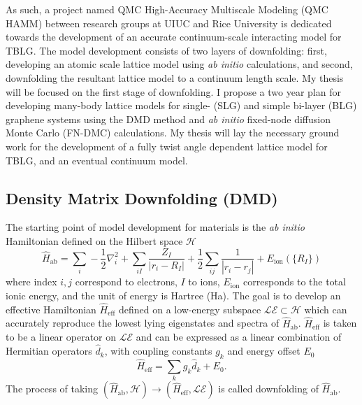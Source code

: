 \documentclass[12pt]{article}
\begin{document}
As such, a project named QMC High-Accuracy Multiscale Modeling (QMC HAMM) between research groups at UIUC and Rice University is dedicated towards the development of an accurate continuum-scale interacting model for TBLG.
The model development consists of two layers of downfolding: first, developing an atomic scale lattice model using \textit{ab initio} calculations, and second, downfolding the resultant lattice model to a continuum length scale.
My thesis will be focused on the first stage of downfolding.
I propose a two year plan for developing many-body lattice models for single- (SLG) and simple bi-layer (BLG) graphene systems using the DMD method and \textit{ab initio} fixed-node diffusion Monte Carlo (FN-DMC) calculations.
My thesis will lay the necessary ground work for the development of a fully twist angle dependent lattice model for TBLG, and an eventual continuum model.

\subsection{Density Matrix Downfolding (DMD)}
The starting point of model development for materials is the \textit{ab initio} Hamiltonian defined on the Hilbert space $\mathcal{H}$
\begin{equation}
\hat{H}_\text{ab} = \sum_i -\frac{1}{2} \nabla_i^2 + \sum_{iI}\frac{Z_I}{|r_i - R_I|} + \frac{1}{2} \sum_{ij} \frac{1}{|r_i - r_j|} + E_\text{ion}(\{R_I\})  
\label{eq:Hab}
\end{equation}
where index $i,j$ correspond to electrons, $I$ to ions, $E_\text{ion}$ corresponds to the total ionic energy, and the unit of energy is Hartree (Ha).
The goal is to develop an effective Hamiltonian $\hat{H}_\text{eff}$ defined on a low-energy subspace $\mathcal{LE} \subset \mathcal{H}$ which can accurately reproduce the lowest lying eigenstates and spectra of $\hat{H}_\text{ab}$.
$\hat{H}_\text{eff}$ is taken to be a linear operator on $\mathcal{LE}$ and can be expressed as a linear combination of Hermitian operators $\hat{d}_k$, with coupling constants $g_k$ and energy offset $E_0$
\begin{equation}
\hat{H}_\text{eff} = \sum_{k} g_k \hat{d}_k  + E_0.
\label{eq:Heff}
\end{equation}
The process of taking $(\hat{H}_\text{ab}, \mathcal{H}) \rightarrow (\hat{H}_\text{eff}, \mathcal{LE})$ is called downfolding of $\hat{H}_\text{ab}$.
\end{document}
